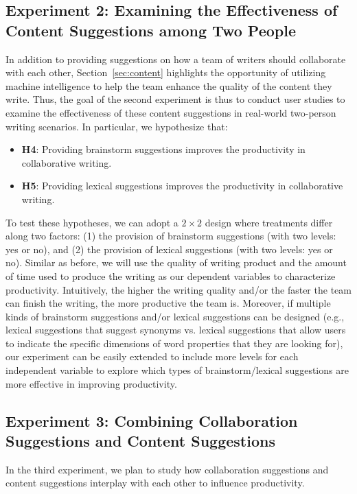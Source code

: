 \subsection{Experiment 2: Examining the Effectiveness of Content Suggestions among Two People}
\label{sec:exp2}
In addition to providing suggestions on how a team of writers should collaborate with each other, Section~\ref{sec:content} highlights the opportunity of utilizing machine intelligence to help the team enhance the quality of the content they write. Thus, the goal of the second experiment is thus to conduct user studies to examine the effectiveness of these content suggestions in real-world two-person writing scenarios. In particular, we hypothesize that:
\begin{itemize}
\item{\bf H4}: Providing brainstorm suggestions improves the productivity in collaborative writing.
\item{\bf H5}: Providing lexical suggestions improves the productivity in collaborative writing.
\end{itemize}

To test these hypotheses, we can adopt a $2\times 2$ design where treatments differ along two factors: (1) the provision of brainstorm suggestions (with two levels: yes or no), and (2) the provision of lexical suggestions (with two levels: yes or no). Similar as before, we will use the quality of writing product and the amount of time used to produce the writing as our dependent variables to characterize productivity. Intuitively, the higher the writing quality and/or the faster the team can finish the writing, the more productive the team is. Moreover, if multiple kinds of brainstorm suggestions and/or lexical suggestions can be designed (e.g., lexical suggestions that suggest synonyms vs. lexical suggestions that allow users to indicate the specific dimensions of word properties that they are looking for), our experiment can be easily extended to include more levels for each independent variable to explore which types of brainstorm/lexical suggestions are more effective in improving productivity.

\subsection{Experiment 3: Combining Collaboration Suggestions and Content Suggestions}
\label{sec:exp3}

In the third experiment, we plan to study how collaboration suggestions and content suggestions interplay with each other to influence productivity.  


